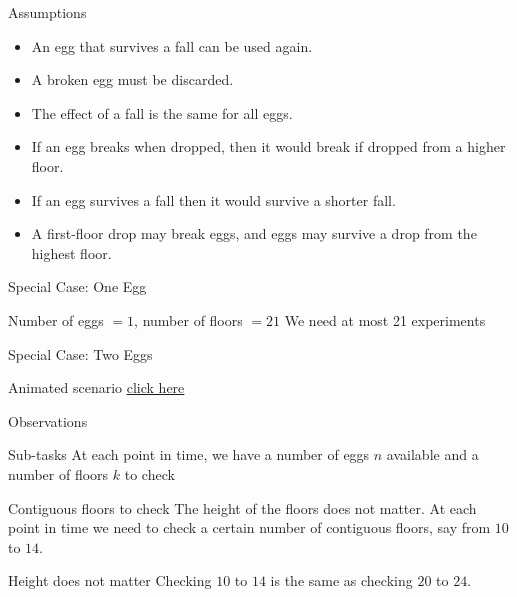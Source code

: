 \begin{frame}{Assumptions}

\begin{itemize}
\item An egg that survives a fall can be used again.
\item A broken egg must be discarded.
\item The effect of a fall is the same for all eggs.
\item If an egg breaks when dropped, 
then it would break if dropped from a higher floor.
\item If an egg survives a fall then it would survive a shorter fall.
\item A first-floor drop may break eggs, and eggs may survive
a drop from the highest floor.
\end{itemize}

\end{frame}


\begin{frame}{Special Case: One Egg}

\begin{block}{Number of eggs $= 1$, number of floors $= 21$}
We need at most 21 experiments
\end{block}

\end{frame}


\begin{frame}{Special Case: Two Eggs}

\begin{block}{Animated scenario}
\href{http://archive.ite.journal.informs.org/Vol4No1/Sniedovich/index.php}{click here}
\end{block}

\end{frame}


\begin{frame}{Observations}

\begin{block}{Sub-tasks}
At each point in time, we have a number of eggs $n$ available 
and a number of floors $k$ to check
\end{block}

\begin{block}{Contiguous floors to check}
The height of the floors does not matter. At each point in time
we need to check a certain number of contiguous floors, say from
$10$ to $14$.
\end{block}

\begin{block}{Height does not matter}
Checking $10$ to $14$ is the same as checking 
$20$ to $24$.
\end{block}

\end{frame}

